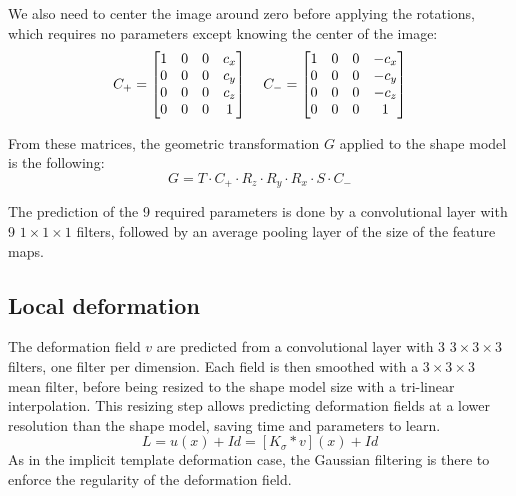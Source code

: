 We also need to center the image around zero before applying the rotations, which requires no parameters except knowing the center of the image:
\begin{equation*}
    C_+ = 
    \begin{bmatrix}
        1 & 0 & 0 & c_x \\
        0 & 0 & 0 & c_y \\
        0 & 0 & 0 & c_z \\ 
        0 & 0 & 0 & 1
    \end{bmatrix}
    \mkern20mu
    C_- = 
    \begin{bmatrix}
        1 & 0 & 0 & -c_x \\
        0 & 0 & 0 & -c_y \\
        0 & 0 & 0 & -c_z \\ 
        0 & 0 & 0 & 1
    \end{bmatrix}
\end{equation*}

From these matrices, the geometric transformation $G$ applied to the shape model is the following:
\begin{equation}
    G = T \cdot C_+ \cdot R_z \cdot R_y \cdot R_x \cdot S \cdot C_-
\end{equation}

The prediction of the 9 required parameters is done by a convolutional layer with 9 $1 \times 1 \times 1$ filters, followed by an average pooling layer of the size of the feature maps. 

\subsection{Local deformation}
\label{ssec:seg_local}

The deformation field $v$ are predicted from a convolutional layer with 3 $3 \times 3 \times 3$ filters, one filter per dimension. Each field is then smoothed with a $3 \times 3 \times 3$ mean filter, before being resized to the shape model size with a tri-linear interpolation. This resizing step allows predicting deformation fields at a lower resolution than the shape model, saving time and parameters to learn.
\begin{equation}
    L = u(x) + Id = [K_{\sigma} * v](x) + Id
\end{equation}
As in the implicit template deformation case, the Gaussian filtering is there to enforce the regularity of the deformation field.


